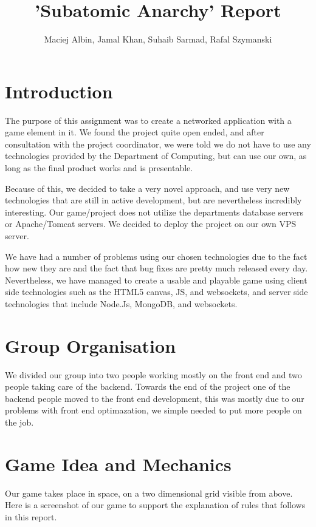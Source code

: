 \documentclass[a4paper,11pt]{article}
\title{'Subatomic Anarchy' Report}
\author{Maciej Albin, Jamal Khan, Suhaib Sarmad, Rafal Szymanski}
\begin{document}
 
	\maketitle
	
	\tableofcontents
	\newpage
	
	\section{Introduction}
	
		The purpose of this assignment was to create a networked application with a game element in it. We found the project quite open ended, and after consultation with the project coordinator, we were told we do not have to use any technologies provided by the Department of Computing, but can use our own, as long as the final product works and is presentable.

		Because of this, we decided to take a very novel approach, and use very new technologies that are still in active development, but are nevertheless incredibly interesting. Our game/project does not utilize the departments database servers or Apache/Tomcat servers. We decided to deploy the project on our own VPS server.

		We have had a number of problems using our chosen technologies due to the fact how new they are and the fact that bug fixes are pretty much released every day. Nevertheless, we have managed to create a usable and playable game using client side technologies such as the HTML5 canvas, JS, and websockets, and server side technologies that include Node.Js, MongoDB, and websockets.
		
	\section{Group Organisation}
	We divided our group into two people working mostly on the front end and two people taking care of the backend. Towards the end of the project one of the backend people moved to the front end development, this was mostly due to our problems with front end optimazation, we simple needed to put more people on the job.
		
	\section{Game Idea and Mechanics}
	
		Our game takes place in space, on a two dimensional grid visible from above. Here is a screenshot of our game to support the explanation of rules that follows in this report.
		
\end{document}
